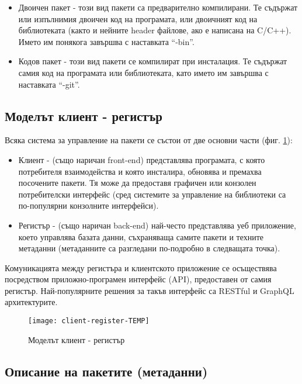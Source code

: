 \begin{itemize}
    \item Двоичен пакет - този вид пакети са предварително компилирани. Те
          съдържат или изпълнимия двоичен код на програмата, или двоичният код
          на библиотеката (както и нейните header файлове, ако е написана на
          C/C++). Името им понякога завършва с наставката ``-bin''.
    \item Кодов пакет - този вид пакети се компилират при инсталация. Те
          съдържат самия код на програмата или библиотеката, като името им
          завършва с наставката ``-git''.
\end{itemize}


\subsection{Моделът клиент - регистър}

Всяка система за управление на пакети се състои от две основни части (фиг.
\ref{fig:client-register}):

\begin{itemize}
    \item Клиент - (също наричан front-end) представлява програмата, с която
          потребителя взаимодейства и която инсталира, обновява и премахва
          посочените пакети. Тя може да предоставя графичен или конзолен
          потребителски интерфейс (сред системите за управление на библиотеки са
          по-популярни конзолните интерфейси).
    \item Регистър - (също наричан back-end) най-често представлява уеб
          приложение, което управлява базата данни, съхраняваща самите пакети и
          техните метаданни (метаданните са разгледани по-подробно в следващата
          точка).
\end{itemize}

Комуникацията между регистъра и клиентското приложение се осъществява
посредством приложно-програмен интерфейс (API), предоставен от самия регистър.
Най-популярните решения за такъв интерфейс са RESTful и GraphQL архитектурите.

\begin{figure}[h]
    \centering
    \texttt{[image: client-register-TEMP]}
    \caption{Моделът клиент - регистър}
    \label{fig:client-register}
\end{figure}


\subsection{Описание на пакетите (метаданни)}

